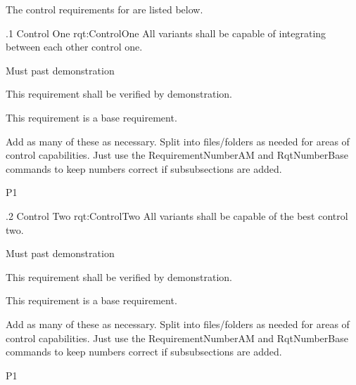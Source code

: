 The control requirements for \ThisSystem are listed below.

\ONERQMTVKPP
{\RqtNumberBase.1}
{Control One}
{rqt:ControlOne}
{All \ThisSys variants shall be capable of integrating between each other control one.}
{
	\item [Phase 1] Must past demonstration
}
{This requirement shall be verified by demonstration.}
{
	\item [N/A] This requirement is a base requirement.
}
{
  \item Add as many of these as necessary.  Split into files/folders as needed for areas of control capabilities. Just use the RequirementNumberAM and RqtNumberBase commands to keep numbers correct if subsubsections are added.
}
{P1}

\ONERQMTVKPP
{\RqtNumberBase.2}
{Control Two}
{rqt:ControlTwo}
{All \ThisSys variants shall be capable of the best control two.}
{
	\item [Phase 1] Must past demonstration
}
{This requirement shall be verified by demonstration.}
{
	\item [N/A] This requirement is a base requirement.
}
{
  \item Add as many of these as necessary.  Split into files/folders as needed for areas of control capabilities. Just use the RequirementNumberAM and RqtNumberBase commands to keep numbers correct if subsubsections are added.
}
{P1}
